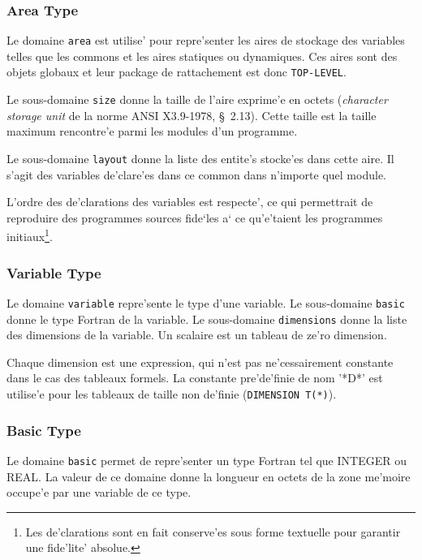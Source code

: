 \subsubsection{Area Type}
\label{subsubsection-area}


Le domaine {\tt area} est utilise' pour repre'senter les aires de
stockage des variables telles que les commons et les aires statiques ou
dynamiques. Ces aires sont des objets globaux et leur package de
rattachement est donc \verb/TOP-LEVEL/.

Le sous-domaine {\tt size} donne la taille de l'aire
exprime'e en octets ({\em character storage unit} de la norme ANSI
X3.9-1978, \S~2.13). Cette taille est la taille maximum rencontre'e
parmi les modules d'un programme. 

Le sous-domaine {\tt layout} donne la
liste des entite's stocke'es dans cette aire. Il s'agit des variables
de'clare'es dans ce common dans n'importe quel module.

L'ordre des de'clarations des variables est respecte', ce qui
permettrait de reproduire des programmes sources fide`les a` ce
qu'e'taient les programmes initiaux\footnote{Les de'clarations sont en
fait conserve'es sous forme textuelle pour garantir une fide'lite'
absolue.}.

\subsubsection{Variable Type}
\label{subsubsection-variable}

{
Le domaine \verb/variable/ repre'sente le type d'une variable.  Le
sous-domaine \verb/basic/ donne le type Fortran de la variable.  Le
sous-domaine \verb/dimensions/ donne la liste des dimensions de la variable.
Un scalaire est un tableau de ze'ro dimension.

Chaque dimension est une expression, qui n'est pas ne'cessairement
constante dans le cas des tableaux formels. La constante pre'de'finie de
nom '*D*' est utilise'e pour les tableaux de taille non de'finie
(\verb/DIMENSION T(*)/).
}

\subsubsection{Basic Type}
\label{subsubsection-basic}

{
Le domaine \verb/basic/ permet de repre'senter un type Fortran tel que
INTEGER ou REAL. La valeur de ce domaine donne la longueur en octets de
la zone me'moire occupe'e par une variable de ce type.
}

